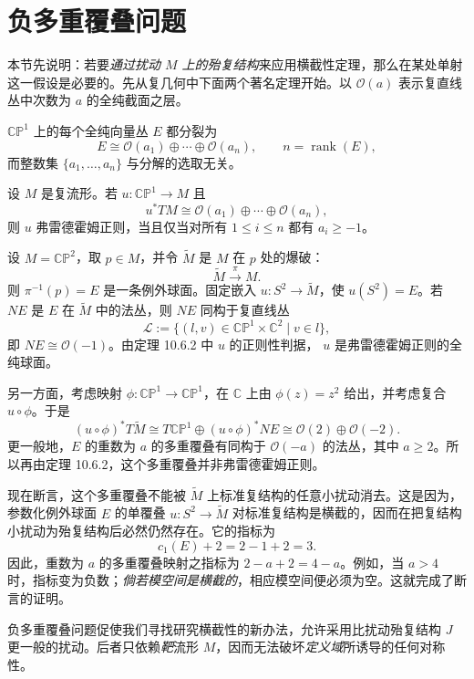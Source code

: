 \section{负多重覆叠问题}
\label{sec:negative-multiple-covers}

本节先说明：若要\emph{通过扰动 $M$ 上的殆复结构}来应用横截性定理，那么在某处单射这一假设是必要的。先从复几何中下面两个著名定理开始。以
$\mathcal O(a)$ 表示复直线丛中次数为 $a$ 的全纯截面之层。

\begin{theorem}\label{thm:grothendieck-splitting-cp1}
$\mathbb{CP}^1$ 上的每个全纯向量丛 $E$ 都分裂为
\[
 E\cong\mathcal O(a_1)\oplus\cdots\oplus\mathcal O(a_n),
 \qquad n=\operatorname{rank}(E),
\]
而整数集 $\{a_1,\ldots,a_n\}$ 与分解的选取无关。
\end{theorem}

\begin{theorem}\label{thm:fredholm-regular-splitting-criterion}
设 $M$ 是复流形。若 $u:\mathbb{CP}^1\to M$ 且
\[
 u^*TM\cong\mathcal O(a_1)\oplus\cdots\oplus\mathcal O(a_n),
\]
则 $u$ 弗雷德霍姆正则，当且仅当对所有 $1\leq i\leq n$ 都有
$a_i\geq-1$。
\end{theorem}

\begin{example}\label{ex:negative-multiple-cover-blowup}
设 $M=\mathbb{CP}^2$，取 $p\in M$，并令 $\widetilde M$ 是 $M$ 在
$p$ 处的爆破：
\[
 \widetilde M\xrightarrow{\ \pi\ }M.
\]
则 $\pi^{-1}(p)=E$ 是一条例外球面。固定嵌入
$u:S^2\to\widetilde M$，使 $u(S^2)=E$。若 $NE$ 是 $E$ 在
$\widetilde M$ 中的法丛，则 $NE$ 同构于复直线丛
\[
 \mathcal L:=\{(l,v)\in\mathbb{CP}^1\times\mathbb C^2\mid v\in l\},
\]
即 $NE\cong\mathcal O(-1)$。由定理 10.6.2 中 $u$ 的正则性判据，
$u$ 是弗雷德霍姆正则的全纯球面。

另一方面，考虑映射
$\phi:\mathbb{CP}^1\to\mathbb{CP}^1$，在 $\mathbb C$ 上由
$\phi(z)=z^2$ 给出，并考虑复合 $u\circ\phi$。于是
\[
 (u\circ\phi)^*T\widetilde M
 \cong T\mathbb{CP}^1\oplus(u\circ\phi)^*NE
 \cong\mathcal O(2)\oplus\mathcal O(-2).
\]
更一般地，$E$ 的重数为 $a$ 的多重覆叠有同构于
$\mathcal O(-a)$ 的法丛，其中 $a\geq2$。所以再由定理 10.6.2，这个多重覆叠并非弗雷德霍姆正则。

现在断言，这个多重覆叠不能被 $\widetilde M$ 上标准复结构的任意小扰动消去。这是因为，参数化例外球面
$E$ 的单覆叠
$u:S^2\to\widetilde M$ 对标准复结构是横截的，因而在把复结构小扰动为殆复结构后必然仍然存在。它的指标为
\[
 c_1(E)+2=2-1+2=3.
\]
因此，重数为 $a$ 的多重覆叠映射之指标为
$2-a+2=4-a$。例如，当 $a>4$ 时，指标变为负数；\emph{倘若模空间是横截的}，相应模空间便必须为空。这就完成了断言的证明。

负多重覆叠问题促使我们寻找研究横截性的新办法，允许采用比扰动殆复结构 $J$ 更一般的扰动。后者只依赖\emph{靶}流形
$M$，因而无法破坏\emph{定义域}所诱导的任何对称性。
\end{example}
